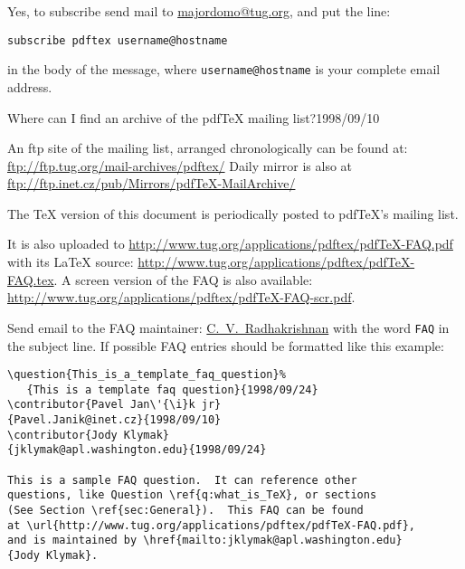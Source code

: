 \documentclass{article}
\begin{document}
Yes, to subscribe send mail to \href{mailto:majordomo@tug.org}%
{majordomo@tug.org}, and put the line:
\begin{verbatim}
subscribe pdftex username@hostname
\end{verbatim}
\noindent  in the body of the message, where \verb+username@hostname+ is your complete
  email address.


 {Where can I find an archive of the pdf\TeX{} mailing list?}{1998/09/10}

An ftp site of the mailing list, arranged chronologically can be
  found at: \url{ftp://ftp.tug.org/mail-archives/pdftex/} Daily mirror
  is also at \url{ftp://ftp.inet.cz/pub/Mirrors/pdfTeX-MailArchive/}


  The \TeX{} version of this document is periodically posted to pdf\TeX's
  mailing list.

  It is also uploaded to
  \url{http://www.tug.org/applications/pdftex/pdfTeX-FAQ.pdf}
  with its \LaTeX{} source:
  \url{http://www.tug.org/applications/pdftex/pdfTeX-FAQ.tex}.
  A screen version of the FAQ is also available:
  \url{http://www.tug.org/applications/pdftex/pdfTeX-FAQ-scr.pdf}.




Send email to the FAQ maintainer: \href{cvr@river-valley.com}%
{C.~V.~Radhakrishnan} with the word
\texttt{FAQ} in the subject line.  If possible FAQ entries should be
formatted like this example:

\begin{verbatim}
\question{This_is_a_template_faq_question}%
   {This is a template faq question}{1998/09/24}
\contributor{Pavel Jan\'{\i}k jr}
{Pavel.Janik@inet.cz}{1998/09/10}
\contributor{Jody Klymak}
{jklymak@apl.washington.edu}{1998/09/24}

This is a sample FAQ question.  It can reference other
questions, like Question \ref{q:what_is_TeX}, or sections
(See Section \ref{sec:General}).  This FAQ can be found
at \url{http://www.tug.org/applications/pdftex/pdfTeX-FAQ.pdf},
and is maintained by \href{mailto:jklymak@apl.washington.edu}
{Jody Klymak}.
\end{verbatim}
\end{document}
